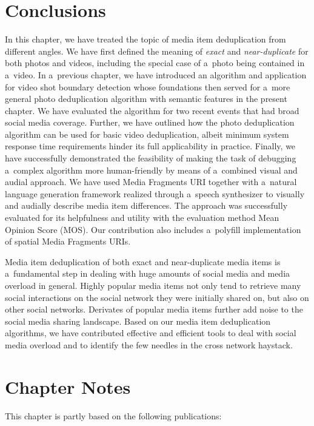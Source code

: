 \section{Conclusions}

In this chapter, we have treated the topic of media item deduplication
from different angles.
We have first defined the meaning of \emph{exact} and \emph{near-duplicate} 
for both photos and videos,
including the special case of a~photo being contained in a~video.
In a~previous chapter,
we have introduced an algorithm and application
for video shot boundary detection
whose foundations then served for a~more general
photo deduplication algorithm with semantic features
in the present chapter.
We have evaluated the algorithm for two recent events
that had broad social media coverage.
Further, we have outlined how the photo deduplication algorithm
can be used for basic video deduplication,
albeit minimum system response time requirements
hinder its full applicability in practice.
Finally, we have successfully demonstrated the feasibility
of making the task of debugging a~complex algorithm
more human-friendly by means of a~combined visual and audial approach.
We have used Media Fragments URI
together with a~natural language generation framework
realized through a~speech synthesizer to visually and audially
describe media item differences.
The approach was successfully evaluated for its helpfulness and utility
with the evaluation method Mean Opinion Score (MOS).
Our contribution also includes a~polyfill implementation
of spatial Media Fragments URIs.

Media item deduplication of both exact and near-duplicate media items
is a~fundamental step in dealing with huge amounts of social media
and media overload in general.
Highly popular media items not only tend
to retrieve many social interactions on the social network
they were initially shared on, but also on other social networks.
Derivates of popular media items further add noise
to the social media sharing landscape.
Based on our media item deduplication algorithms, 
we have contributed effective and efficient tools
to deal with social media overload
and to identify the few needles in the cross network haystack. 

\section*{Chapter Notes}
This chapter is partly based on the following publications:


\clearpage

